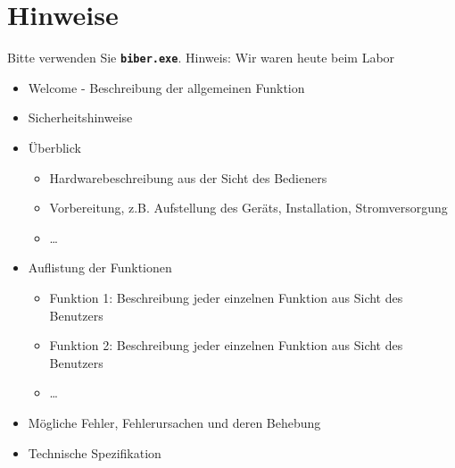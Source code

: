 %
%
%



\chapter{Hinweise}

Bitte verwenden Sie  \textbf{\texttt{biber.exe}}.
Hinweis: Wir waren heute beim Labor


\bigskip

\begin{itemize}
  \item Welcome - Beschreibung der allgemeinen Funktion
  \item Sicherheitshinweise
  \item Überblick
    \begin{itemize}
      \item Hardwarebeschreibung aus der Sicht des  Bedieners
      \item Vorbereitung, z.B. Aufstellung des Geräts, Installation, Stromversorgung
      \item \ldots
    \end{itemize}
  \item Auflistung der Funktionen
    \begin{itemize}
    	\item Funktion 1: Beschreibung jeder einzelnen Funktion aus Sicht des Benutzers
    	\item Funktion 2: Beschreibung jeder einzelnen Funktion aus Sicht des Benutzers
    	\item \ldots
    \end{itemize}
  \item Mögliche Fehler, Fehlerursachen und deren Behebung
  \item Technische Spezifikation
\end{itemize}
